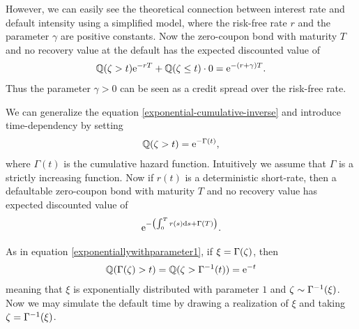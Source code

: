 However, we can easily see the theoretical connection between interest rate and default intensity using a simplified model, where the risk-free rate $r$ and the parameter $\gamma$ are positive constants. Now the zero-coupon bond with maturity $T$ and no recovery value at the default has the expected discounted value of
  \begin{align}
    \mathbb{Q}( \zeta > t ) \mathrm{e}^{-r T} + \mathbb{Q}( \zeta \leq t ) \cdot 0 = \mathrm{e}^{ - (r+\gamma) T} .
  \end{align}
Thus the parameter $\gamma > 0$ can be seen as a credit spread over the risk-free rate.

We can generalize the equation \ref{exponential-cumulative-inverse} and introduce time-dependency by setting
  \begin{align}
    \mathbb{Q}( \zeta > t ) = \mathrm{e}^{- \Gamma(t) } ,
  \end{align}
where $\Gamma(t)$ is the cumulative hazard function. Intuitively we assume that $\Gamma$ is a strictly increasing function. Now if $r(t)$ is a deterministic short-rate, then 
a defaultable zero-coupon bond with maturity $T$ and no recovery value has expected discounted value of
  \begin{align}
    \label{price_with_cumulative_hazard_function}
    \mathrm{e}^{ - \left( \int_0^T r(s) \mathrm{d} s + \Gamma(T) \right) }.
  \end{align}
  
As in equation \ref{exponentiallywithparameter1}, if $\xi = \Gamma(\zeta)$, then
  \begin{align}
    \mathbb{Q}( \Gamma(\zeta) > t ) = \mathbb{Q}( \zeta > \Gamma^{-1}(t) ) = \mathrm{e}^{-t}
  \end{align}
meaning that $\xi$ is exponentially distributed with parameter $1$ and $\zeta \sim \Gamma^{-1}(\xi)$. Now we may simulate the default time by drawing a realization of $\xi$ and taking $\zeta = \Gamma^{-1}(\xi)$.

